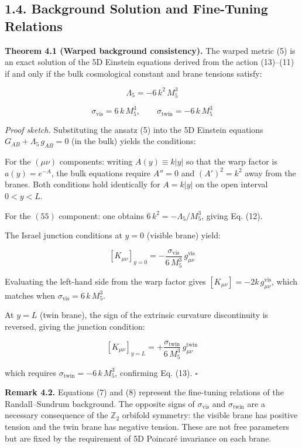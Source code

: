 \documentclass[
  11pt,
]{article}
\begin{document}
\bigskip

\hypertarget{background-solution-and-fine-tuning-relations}{%
\subsection{1.4. Background Solution and Fine-Tuning
Relations}\label{background-solution-and-fine-tuning-relations}}

\textbf{Theorem 4.1 (Warped background consistency).} The warped metric
(5) is an exact solution of the 5D Einstein equations derived from the
action (13)--(11) if and only if the bulk cosmological constant and
brane tensions satisfy:

\[\Lambda_5 = -6\,k^2\,M_5^3 \tag{12}\]

\[\sigma_{\text{vis}} = 6\,k\,M_5^3, \qquad \sigma_{\text{twin}} = -6\,k\,M_5^3 \tag{13}\]

\emph{Proof sketch.} Substituting the ansatz (5) into the 5D Einstein
equations \(G_{AB} + \Lambda_5\,g_{AB} = 0\) (in the bulk) yields the
conditions:

For the \(({\mu\nu})\) components: writing \(A(y) \equiv k|y|\) so that
the warp factor is \(a(y) = e^{-A}\), the bulk equations require
\(A'' = 0\) and \((A')^2 = k^2\) away from the branes. Both conditions
hold identically for \(A = k|y|\) on the open interval \(0 < y < L\).

For the \((55)\) component: one obtains \(6\,k^2 = -\Lambda_5 / M_5^3\),
giving Eq. (12).

The Israel junction conditions at \(y = 0\) (visible brane) yield:

\[[K_{\mu\nu}]_{y=0} = -\frac{\sigma_{\text{vis}}}{6\,M_5^3}\,g_{\mu\nu}^{\text{vis}} \tag{14}\]

Evaluating the left-hand side from the warp factor gives
\([K_{\mu\nu}] = -2k\,g_{\mu\nu}^{\text{vis}}\), which matches when
\(\sigma_{\text{vis}} = 6\,k\,M_5^3\).

At \(y = L\) (twin brane), the sign of the extrinsic curvature
discontinuity is reversed, giving the junction condition:

\[[K_{\mu\nu}]_{y=L} = +\frac{\sigma_{\text{twin}}}{6\,M_5^3}\,g_{\mu\nu}^{\text{twin}} \tag{15}\]

which requires \(\sigma_{\text{twin}} = -6\,k\,M_5^3\), confirming Eq.
(13). \(\square\)

\textbf{Remark 4.2.} Equations (7) and (8) represent the fine-tuning
relations of the Randall--Sundrum background. The opposite signs of
\(\sigma_{\text{vis}}\) and \(\sigma_{\text{twin}}\) are a necessary
consequence of the \(\mathbb{Z}_2\) orbifold symmetry: the visible brane
has positive tension and the twin brane has negative tension. These are
not free parameters but are fixed by the requirement of 5D Poincaré
invariance on each brane.
\end{document}
